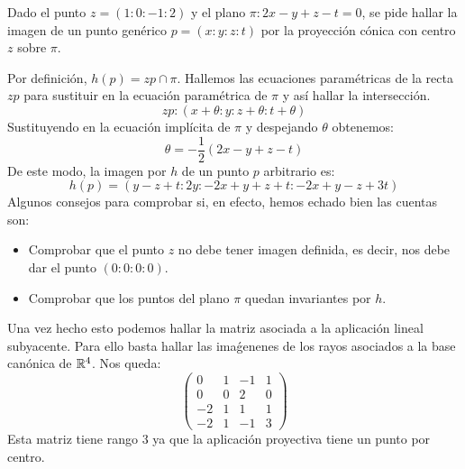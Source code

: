 \begin{exa}
	Dado el punto $z=(1:0:-1:2)$ y el plano $\pi:2x-y+z-t=0$, se pide hallar la imagen de un punto genérico $p=(x:y:z:t)$ por la proyección cónica con centro $z$ sobre $\pi$.
	
	Por definición, $h(p)=zp\cap\pi$. Hallemos las ecuaciones paramétricas de la recta $zp$ para sustituir en la ecuación paramétrica de $\pi$ y así hallar la intersección.
	\[zp:(x+\theta:y:z+\theta:t+\theta)\]
	Sustituyendo en la ecuación implícita de $\pi$ y despejando $\theta$ obtenemos:
	\[\theta=-\frac{1}{2}(2x-y+z-t)\]
	De este modo, la imagen por $h$ de un punto $p$ arbitrario es:
	\[h(p)=(y-z+t:2y:-2x+y+z+t:-2x+y-z+3t)\]
	Algunos consejos para comprobar si, en efecto, hemos echado bien las cuentas son:
	\begin{itemize}
		\item Comprobar que el punto $z$ no debe tener imagen definida, es decir, nos debe dar el punto $(0:0:0:0)$.
		\item Comprobar que los puntos del plano $\pi$ quedan invariantes por $h$.
	\end{itemize}
	Una vez hecho esto podemos hallar la matriz asociada a la aplicación lineal subyacente. Para ello basta hallar las imaǵenenes de los rayos asociados a la base canónica de $\mathbb{R}^4$. Nos queda:
	\[\begin{pmatrix}
	0 & 1 & -1 & 1\\
	0 & 0 & 2 & 0\\
	-2 & 1 & 1 & 1\\
	-2 & 1 & -1 & 3
	\end{pmatrix}\]
	Esta matriz tiene rango $3$ ya que la aplicación proyectiva tiene un punto por centro.
	

\end{exa}

